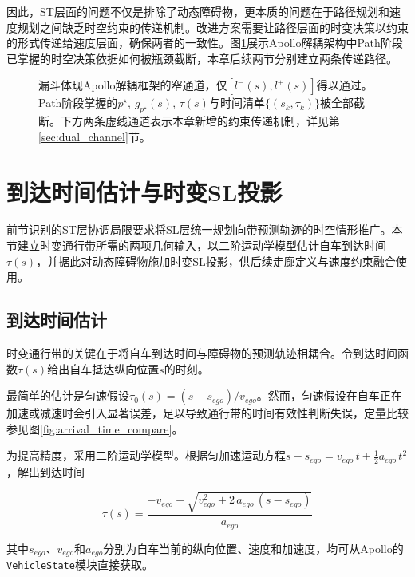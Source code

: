 因此，ST层面的问题不仅是排除了动态障碍物，更本质的问题在于路径规划和速度规划之间缺乏时空约束的传递机制。改进方案需要让路径层面的时变决策以约束的形式传递给速度层面，确保两者的一致性。图\ref{fig:path_speed_breakage}展示Apollo解耦架构中Path阶段已掌握的时空决策依据如何被瓶颈截断，本章后续两节分别建立两条传递路径。

\begin{figure}[htbp]
\centering
{}
\caption{路径与速度规划之间的单向信息传递与时空约束缺口}
\caption*{\scriptsize 漏斗体现Apollo解耦框架的窄通道，仅$[l^-(s),l^+(s)]$得以通过。Path阶段掌握的$p^\star,\,g_{p^\star}(s),\,\tau(s)$与时间清单$\{(s_k,\tau_k)\}$被全部截断。下方两条虚线通道表示本章新增的约束传递机制，详见第\ref{sec:dual_channel}节。}
\label{fig:path_speed_breakage}
\end{figure}

\section{到达时间估计与时变SL投影}
前节识别的ST层协调局限要求将SL层统一规划向带预测轨迹的时空情形推广。本节建立时变通行带所需的两项几何输入，以二阶运动学模型估计自车到达时间$\tau(s)$，并据此对动态障碍物施加时变SL投影，供后续走廊定义与速度约束融合使用。

\subsection{到达时间估计}
\label{sec:arrival_time_estimation}
时变通行带的关键在于将自车到达时间与障碍物的预测轨迹相耦合。令到达时间函数$\tau(s)$给出自车抵达纵向位置$s$的时刻。

最简单的估计是匀速假设$\tau_0(s) = (s - s_{ego}) / v_{ego}$。然而，匀速假设在自车正在加速或减速时会引入显著误差，足以导致通行带的时间有效性判断失误，定量比较参见图\ref{fig:arrival_time_compare}。

为提高精度，采用二阶运动学模型。根据匀加速运动方程$s - s_{ego} = v_{ego}\, t + \frac{1}{2} a_{ego}\, t^2$，解出到达时间

\begin{equation}
    \tau(s) = \frac{-v_{ego} + \sqrt{v_{ego}^2 + 2\, a_{ego}\, (s - s_{ego})}}{a_{ego}}
    \label{eq:arrival_time}
\end{equation}

其中$s_{ego}$、$v_{ego}$和$a_{ego}$分别为自车当前的纵向位置、速度和加速度，均可从Apollo的\texttt{VehicleState}模块直接获取。

